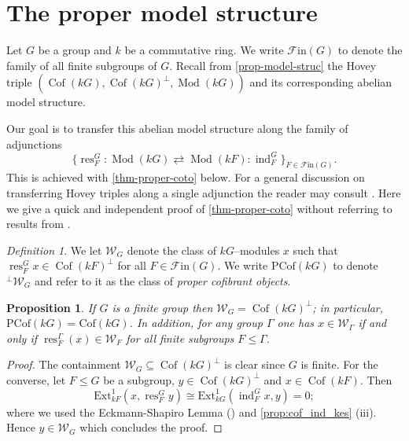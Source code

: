 \documentclass{amsart}
\newcommand{\res}{\operatorname{res}\nolimits}
\newcommand{\ind}{\operatorname{ind}\nolimits}
\def \W{{\mathcal W}}
\def \Fin{{\mathcal{F}\textrm{in}}}
\def \Wfin{{\mathcal W}_{G}}
\DeclareMathOperator{\Mod}{Mod}
\DeclareMathOperator{\Cof}{Cof}
\numberwithin{equation}{section}%
\newtheorem{proposition}[equation]{Proposition}
\theoremstyle{remark}
\newtheorem{definition}[equation]{Definition}
\newtheorem{recollection}[equation]{Recollection}
\begin{document}

\section{The proper model structure}
\label{sec-proper}

Let $G$ be  a group and $k$ be a commutative ring. We write $\Fin(G)$ to denote the family of all finite subgroups of $G$. Recall from \cref{prop-model-struc} the Hovey triple $(\Cof(kG),\Cof(kG)^\perp,\Mod(kG))$ and its corresponding abelian model structure. 

Our goal is to transfer this abelian model structure along the family of adjunctions 
\[\{\res^G_F\colon \Mod(kG) \rightleftarrows \Mod(kF) \colon\ind^G_F\}_{F\in\Fin(G)}.\]
This is achieved with \cref{thm-proper-coto} below. 
For a general discussion on transferring Hovey triples along a single adjunction the reader may consult \cite[Section~5]{Dal-Psa}. Here we give a quick and independent proof of  \cref{thm-proper-coto} without referring to results from  \cite{Dal-Psa}.


\begin{definition}\label{def-prop-model}
    We let $\Wfin$ denote the class of $kG$--modules $x$ such that $\res^G_Fx\in \Cof(kF)^\perp$ for all $F\in \Fin(G)$. 
    We write $\mathrm{PCof}(kG)$ to denote ${}^\perp\Wfin$ and refer to it as the class of \textit{proper cofibrant objects}.  
\end{definition} 



\begin{proposition} 
\label{rem:finite_W}
If $G$ is a finite group then $\Wfin=\Cof(kG)^\perp$; in particular, $\mathrm{PCof}(kG)=\mathrm{Cof}(kG)$. In addition, for any group $\Gamma$ one has $x\in\W_{\Gamma}$ if and only if $\res^{\Gamma}_F(x)\in\mathcal{W}_{F}$ for all finite subgroups $F\leqslant  \Gamma$.
\end{proposition}

\begin{proof}
The containment $\Wfin\subseteq\Cof(kG)^\perp$ is clear since $G$ is finite. For the converse, let $F\leqslant G$ be a subgroup, $y\in\Cof(kG)^\perp$ and $x\in\Cof(kF)$. Then    \[
\mathrm{Ext}^1_{kF}(x,\res^G_F y)\cong  \mathrm{Ext}^1_{kG}(\ind^G_Fx,y)=0;
\] 
where we used the Eckmann-Shapiro Lemma (\cite[Corollary~2.8.4]{Ben98}) and \cref{prop:cof_ind_kes} (iii). Hence $y\in\Wfin$ which concludes the proof.
\end{proof}
\end{document}
